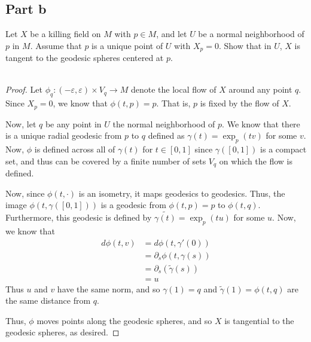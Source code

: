 \documentclass[fontsize=11pt]{scrartcl} %
\numberwithin{equation}{section} %
\numberwithin{figure}{section} %
\numberwithin{table}{section} %
\begin{document}
\subsection*{Part b}
Let $X$ be a killing field on $M$ with $p\in M$, and let $U$ be a normal
neighborhood of $p$ in $M$. Assume that $p$ is a unique point of $U$ with
$X_p=0$. Show that in $U$, $X$ is tangent to the geodesic spheres centered at
$p$.
\\
\\
\begin{proof}
    Let $\phi_q:(-\varepsilon,\varepsilon)\times V_q\to M$ denote the local flow
    of $X$ around any point $q$. Since $X_p = 0$, we know that $\phi(t,p) = p$.
    That is, $p$ is fixed by the flow of $X$. 

    Now, let $q$ be any point in $U$ the normal neighborhood of $p$. We know
    that there is a unique radial geodesic from $p$ to $q$ defined as $\gamma(t)
    = \exp_p(tv)$ for some $v$. Now, $\phi$ is defined
    across all of $\gamma(t)$ for $t\in[0,1]$ since $\gamma([0,1])$ is a compact
    set, and thus can be covered by a finite number of sets $V_q$ on which the
    flow is defined.

    Now, since $\phi(t,\cdot)$ is an isometry, it maps geodesics to geodesics.
    Thus, the image $\phi(t,\gamma([0,1]))$ is a geodesic from $\phi(t,p)=p$ to
    $\phi(t,q)$. Furthermore, this geodesic is defined by $\tilde{\gamma(t)} =
    \exp_p(tu)$ for some $u$. Now, we know that
    \[
\begin{aligned}
    d\phi(t,v) &= d\phi(t,\gamma'(0))\\
    &= \partial_s\phi(t,\gamma(s))\\
    &= \partial_s(\tilde{\gamma}(s))\\
    &= u
\end{aligned}
    \]
    Thus $u$ and $v$ have the same norm, and so $\gamma(1)=q$ and
    $\tilde{\gamma}(1)=\phi(t,q)$ are the same distance from $q$.

    Thus, $\phi$ moves points along the geodesic spheres, and so $X$ is
    tangential to the geodesic spheres, as desired.
\end{proof}
\end{document}
